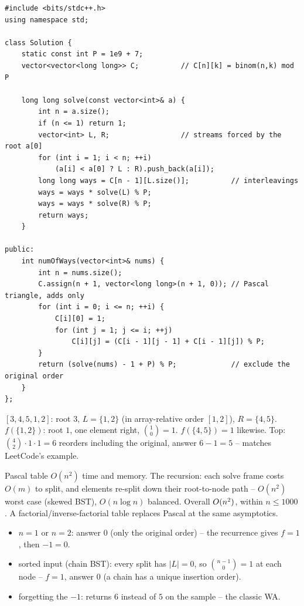 \begin{lstlisting}[caption={Ways to Reorder Array to Get Same BST (LeetCode 1569)}, label={lst:c01-reorder-bst}]
#include <bits/stdc++.h>
using namespace std;

class Solution {
    static const int P = 1e9 + 7;
    vector<vector<long long>> C;          // C[n][k] = binom(n,k) mod P

    long long solve(const vector<int>& a) {
        int n = a.size();
        if (n <= 1) return 1;
        vector<int> L, R;                 // streams forced by the root a[0]
        for (int i = 1; i < n; ++i)
            (a[i] < a[0] ? L : R).push_back(a[i]);
        long long ways = C[n - 1][L.size()];          // interleavings
        ways = ways * solve(L) % P;
        ways = ways * solve(R) % P;
        return ways;
    }

public:
    int numOfWays(vector<int>& nums) {
        int n = nums.size();
        C.assign(n + 1, vector<long long>(n + 1, 0)); // Pascal triangle, adds only
        for (int i = 0; i <= n; ++i) {
            C[i][0] = 1;
            for (int j = 1; j <= i; ++j)
                C[i][j] = (C[i - 1][j - 1] + C[i - 1][j]) % P;
        }
        return (solve(nums) - 1 + P) % P;             // exclude the original order
    }
};
\end{lstlisting}

\begin{tracebox}
$[3,4,5,1,2]$: root $3$, $L=\{1,2\}$ (in array-relative order $[1,2]$), $R=\{4,5\}$.
$f(\{1,2\})$: root $1$, one element right, $\binom{1}{0}=1$. $f(\{4,5\})=1$ likewise.
Top: $\binom{4}{2}\cdot 1 \cdot 1 = 6$ reorders including the original, answer
$6-1=5$ -- matches LeetCode's example.
\end{tracebox}

\begin{complexitybox}
Pascal table $O(n^2)$ time and memory. The recursion: each $\text{solve}$ frame
costs $O(m)$ to split, and elements re-split down their root-to-node path -- $O(n^2)$
worst case (skewed BST), $O(n\log n)$ balanced. Overall $O(n^2)$, within $n\le1000$.
A factorial/inverse-factorial table replaces Pascal at the same asymptotics.
\end{complexitybox}

\begin{itemize}[nosep]
  \item $n=1$ or $n=2$: answer $0$ (only the original order) -- the recurrence gives
        $f=1$, then $-1=0$. \hfill{}
  \item sorted input (chain BST): every split has $|L|=0$, so $\binom{n-1}{0}=1$ at each
        node -- $f=1$, answer $0$ (a chain has a unique insertion order).
  \item forgetting the $-1$: returns $6$ instead of $5$ on the sample -- the classic WA.
\end{itemize}


